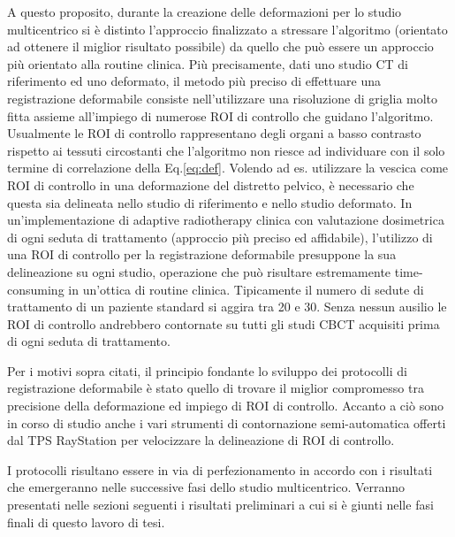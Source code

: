 A questo proposito, durante la creazione delle deformazioni per lo studio multicentrico si è distinto l'approccio finalizzato a stressare l'algoritmo (orientato ad ottenere il miglior risultato possibile) da quello che può essere un approccio più orientato alla routine clinica. Più precisamente, dati uno studio CT di riferimento ed uno deformato, il metodo più preciso di effettuare una registrazione deformabile consiste nell'utilizzare una risoluzione di griglia molto fitta assieme all'impiego di numerose ROI di controllo che guidano l'algoritmo. Usualmente le ROI di controllo rappresentano degli organi a basso contrasto rispetto ai tessuti circostanti che l'algoritmo non riesce ad individuare con il solo termine di correlazione della Eq.\eqref{eq:def}. Volendo ad es. utilizzare la vescica come ROI di controllo in una deformazione del distretto pelvico, è necessario che questa sia delineata nello studio di riferimento e nello studio deformato. In un'implementazione di adaptive radiotherapy clinica con valutazione dosimetrica di ogni seduta di trattamento (approccio più preciso ed affidabile), l'utilizzo di una ROI di controllo per la registrazione deformabile presuppone la sua delineazione su ogni studio, operazione che può risultare estremamente time-consuming in un'ottica di routine clinica. Tipicamente il numero di sedute di trattamento di un paziente standard si aggira tra 20 e 30. Senza nessun ausilio le ROI di controllo andrebbero contornate su tutti gli studi CBCT acquisiti prima di ogni seduta di trattamento.

Per i motivi sopra citati, il principio fondante lo sviluppo dei protocolli di registrazione deformabile è stato quello di trovare il miglior compromesso tra precisione della deformazione ed impiego di ROI di controllo. Accanto a ciò sono in corso di studio anche i vari strumenti di contornazione semi-automatica offerti dal TPS RayStation per velocizzare la delineazione di ROI di controllo.

I protocolli risultano essere in via di perfezionamento in accordo con i risultati che emergeranno nelle successive fasi dello studio multicentrico. Verranno presentati nelle sezioni seguenti i risultati preliminari a cui si è giunti nelle fasi finali di questo lavoro di tesi. 

